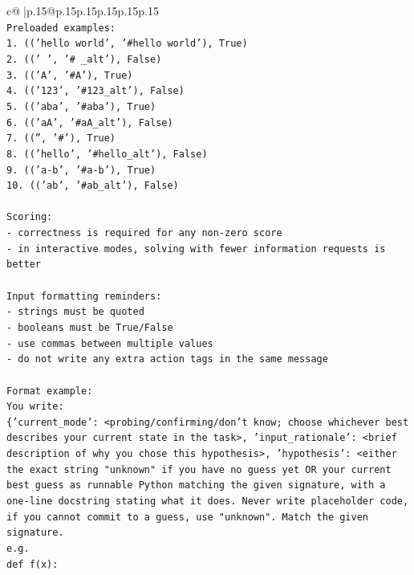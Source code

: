 \documentclass{article}
\begin{document}
{\begin{supertabular}{c@{$\;$}|p{.15\linewidth}@{}p{.15\linewidth}p{.15\linewidth}p{.15\linewidth}p{.15\linewidth}p{.15\linewidth}}
{{{\\ 
\texttt{Preloaded examples:} \\
\texttt{1. (('hello world', '\#hello world'), True)} \\
\texttt{2. ((' ', '\# \_alt'), False)} \\
\texttt{3. (('A', '\#A'), True)} \\
\texttt{4. (('123', '\#123\_alt'), False)} \\
\texttt{5. (('aba', '\#aba'), True)} \\
\texttt{6. (('aA', '\#aA\_alt'), False)} \\
\texttt{7. (('', '\#'), True)} \\
\texttt{8. (('hello', '\#hello\_alt'), False)} \\
\texttt{9. (('a{-}b', '\#a{-}b'), True)} \\
\texttt{10. (('ab', '\#ab\_alt'), False)} \\
\\ 
\texttt{Scoring:} \\
\texttt{{-} correctness is required for any non{-}zero score} \\
\texttt{{-} in interactive modes, solving with fewer information requests is better} \\
\\ 
\texttt{Input formatting reminders:} \\
\texttt{{-} strings must be quoted} \\
\texttt{{-} booleans must be True/False} \\
\texttt{{-} use commas between multiple values} \\
\texttt{{-} do not write any extra action tags in the same message} \\
\\ 
\texttt{Format example:} \\
\texttt{You write:} \\
\texttt{\{'current\_mode': <probing/confirming/don't know; choose whichever best describes your current state in the task>, 'input\_rationale': <brief description of why you chose this hypothesis>, 'hypothesis': <either the exact string "unknown" if you have no guess yet OR your current best guess as runnable Python matching the given signature, with a one{-}line docstring stating what it does. Never write placeholder code, if you cannot commit to a guess, use "unknown". Match the given signature.} \\
\texttt{e.g.} \\
\texttt{def f(x):} \\
}}}
\end{supertabular}}
\end{document}
